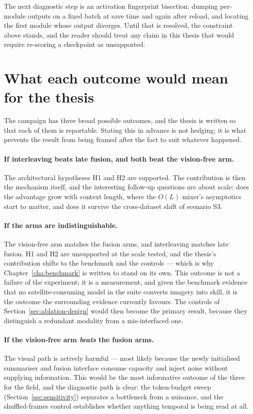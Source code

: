 The next diagnostic step is an activation fingerprint bisection: dumping per-module outputs
on a fixed batch at save time and again after reload, and locating the first module whose
output diverges. Until that is resolved, the constraint above stands, and the reader should
treat any claim in this thesis that would require re-scoring a checkpoint as unsupported.

\section{What each outcome would mean for the thesis}
\label{sec:outcomes}

The campaign has three broad possible outcomes, and the thesis is written so that each of
them is reportable. Stating this in advance is not hedging; it is what prevents the result
from being framed after the fact to suit whatever happened.

\paragraph{If interleaving beats late fusion, and both beat the vision-free arm.} The
architectural hypotheses H1 and H2 are supported. The contribution is then the mechanism
itself, and the interesting follow-up questions are about scale: does the advantage grow with
context length, where the $O(L)$ mixer's asymptotics start to matter, and does it survive the
cross-dataset shift of scenario S3.

\paragraph{If the arms are indistinguishable.} The vision-free arm matches the fusion arms,
and interleaving matches late fusion. H1 and H2 are unsupported at the scale tested, and the
thesis's contribution shifts to the benchmark and the controls --- which is why
Chapter~\ref{cha:benchmark} is written to stand on its own. This outcome is not a failure of
the experiment; it is a measurement, and given the benchmark evidence that no
satellite-consuming model in the suite converts imagery into skill, it is the outcome the
surrounding evidence currently favours. The controls of Section~\ref{sec:ablation-design}
would then become the primary result, because they distinguish a redundant modality from a
mis-interfaced one.

\paragraph{If the vision-free arm \emph{beats} the fusion arms.} The visual path is actively
harmful --- most likely because the newly initialised summariser and fusion interface consume
capacity and inject noise without supplying information. This would be the most informative
outcome of the three for the field, and the diagnostic path is clear: the token-budget sweep
(Section~\ref{sec:sensitivity}) separates a bottleneck from a nuisance, and the shuffled-frames
control establishes whether anything temporal is being read at all.

